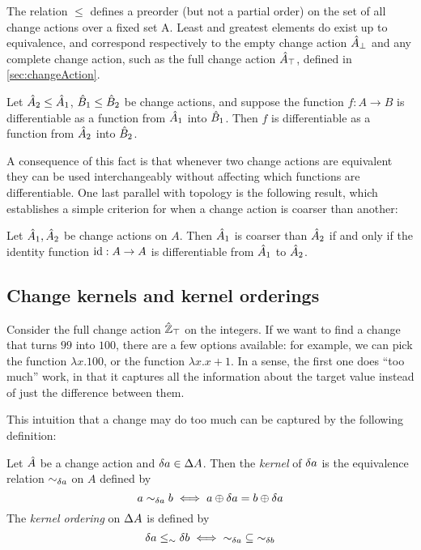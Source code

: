 The relation $\leq$  defines a preorder (but not a partial order) on the set of all change actions 
over a fixed set A. Least and greatest elements do exist up to equivalence, and correspond
respectively to the empty change action $\hat{A}_\bot$ and any complete change
action, such as the full change action $\hat{A}_\top$,
defined in \cref{sec:changeAction}.

\begin{prop}
  Let $\hat{A}_2 \leq \hat{A}_1$, $\hat{B}_1 \leq \hat{B}_2$ be change actions, and suppose
  the function $f : A \rightarrow B$ is differentiable as a function from $\hat{A}_1$ into
  $\hat{B}_1$. Then $f$ is differentiable as a function from $\hat{A}_2$ into $\hat{B}_2$.
\end{prop}

A consequence of this fact is that whenever two change actions are equivalent
they can be used interchangeably without affecting which functions are differentiable. One last parallel with topology
is the following result, which establishes a simple criterion for when a change action is coarser than
another:

\begin{prop}
  Let $\hat{A}_1, \hat{A}_2$ be change actions on $A$. Then $\hat{A}_1$ is coarser than $\hat{A}_2$
  if and only if the identity function $\operatorname{id} : A \rightarrow A$ is differentiable from $\hat{A}_1$ to
  $\hat{A}_2$.
\end{prop}

\subsection{Change kernels and kernel orderings}

Consider the full change action $\hat{\mathbb{Z}}_\top$ on the integers.
If we want to find a change that turns $99$ into $100$, there
are a few options available: for example, we can pick the function $\lambda x . 100$, or
the function $\lambda x . x + 1$. In a sense, the first one does ``too much''
work, in that it captures all the information about the target value instead of
just the difference between them.

This intuition that a change may do too much can be captured by the following definition:
\begin{defn}
  Let $\hat{A}$ be a change action and $\delta a \in \Delta A$. Then the
  \emph{kernel} of $\delta a$ is the equivalence relation $\sim_{\delta a}$ on $A$
  defined by
  \begin{displaymath}
    a \sim_{\delta a} b \iff 
     a \oplus \delta a = b \oplus \delta a
  \end{displaymath}
  The \emph{kernel ordering} on $\Delta A$ is defined by
  \begin{displaymath}
    {\delta a \leq_\sim\delta b} \iff {{\sim_{\delta a}} \subseteq {\sim_{\delta b}}}
  \end{displaymath}
\end{defn}

